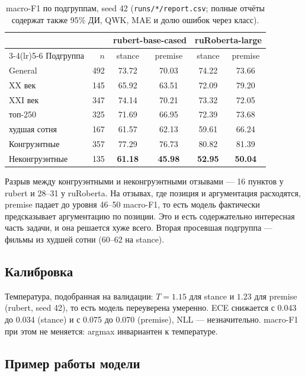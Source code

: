 \documentclass{article}
\begin{document}
\begin{table}[!tbh]
\centering
\begin{tabular}{lrcccc}
\toprule
& & \multicolumn{2}{c}{rubert-base-cased} & \multicolumn{2}{c}{ruRoberta-large} \\
\cmidrule(lr){3-4}\cmidrule(lr){5-6}
Подгруппа & $n$ & stance & premise & stance & premise \\
\midrule
General       & 492 & 73.72 & 70.03 & 74.22 & 73.66 \\
XX век        & 145 & 65.92 & 63.51 & 72.09 & 79.20 \\
XXI век       & 347 & 74.14 & 70.21 & 73.32 & 72.05 \\
топ-250       & 325 & 71.69 & 66.95 & 72.39 & 73.68 \\
худшая сотня  & 167 & 61.57 & 62.13 & 59.61 & 66.24 \\
Конгруэнтные  & 357 & 77.29 & 76.73 & 80.82 & 81.39 \\
Неконгруэнтные & 135 & \textbf{61.18} & \textbf{45.98} & \textbf{52.95} & \textbf{50.04} \\
\bottomrule
\end{tabular}
\caption{macro-F1 по подгруппам, seed 42 (\texttt{runs/*/report.csv}; полные отчёты
содержат также 95\% ДИ, QWK, MAE и долю ошибок через класс).}
\label{tab:subgroups}
\end{table}

Разрыв между конгруэнтными и неконгруэнтными отзывами --- 16 пунктов у rubert и 28--31
у ruRoberta. На отзывах, где позиция и аргументация расходятся, premise падает до
уровня 46--50 macro-F1, то есть модель фактически предсказывает аргументацию по позиции.
Это и есть содержательно интересная часть задачи, и она решается хуже всего.
Вторая просевшая подгруппа --- фильмы из худшей сотни (60--62 на stance).

\subsection{Калибровка}

Температура, подобранная на валидации: $T = 1.15$ для stance и $1.23$ для premise
(rubert, seed 42), то есть модель переуверена умеренно. ECE снижается с 0.043 до 0.034
(stance) и с 0.075 до 0.070 (premise), NLL --- незначительно. macro-F1 при этом не меняется:
argmax инвариантен к температуре.

\subsection{Пример работы модели}
\end{document}
